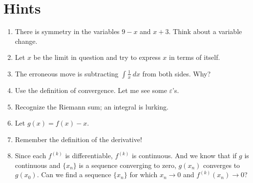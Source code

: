 \documentclass{article}
\theoremstyle{definition}
\theoremstyle{remark}
\newcommand{\eps}{\varepsilon}
\begin{document}
\section{Hints}
\begin{enumerate}
    \item There is symmetry in the variables $9-x$ and $x+3$. Think about a variable change.
    \item Let $x$ be the limit in question and try to express $x$ in terms of itself.
    \item The erroneous move is subtracting $\int \frac{1}{x}\ dx$ from both sides. Why?
    \item Use the definition of convergence. Let me see some $\eps$'s.
    \item Recognize the Riemann sum; an integral is lurking.
    \item Let $g(x)=f(x)-x$.
    \item Remember the definition of the derivative!
    \item Since each $f^{(k)}$ is differentiable, $f^{(k)}$ is continuous. And we know that if $g$ is continuous and $\{x_n\}$ is a sequence converging to zero, $g(x_n)$ converges to $g(x_0)$. Can we find a sequence $\{x_n\}$ for which $x_n \to 0$ and $f^{(k)}(x_n)\to 0$?
\end{enumerate}
\end{document}
